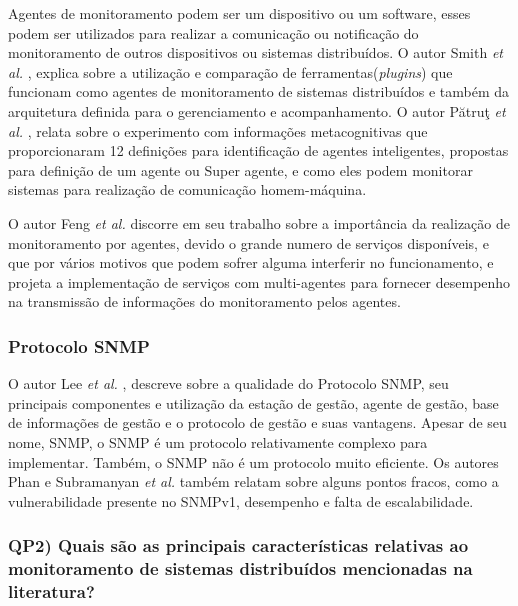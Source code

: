 Agentes de monitoramento podem ser um dispositivo ou um software, esses podem ser utilizados para realizar a comunicação ou notificação do monitoramento de outros dispositivos ou sistemas distribuídos. O autor Smith \textit{et al.} \cite{smith2008flexible}, explica sobre a utilização e comparação de ferramentas(\textit{plugins}) que funcionam como agentes de monitoramento de sistemas distribuídos e também da arquitetura definida para o gerenciamento e acompanhamento. O autor Pătruţ \textit{et al.} \cite{puatruct2010agent}, relata sobre o experimento com informações metacognitivas que proporcionaram 12 definições para identificação de agentes inteligentes, propostas para definição de um agente ou Super agente, e como eles podem monitorar sistemas para realização de comunicação homem-máquina.

O autor Feng \textit{et al.} \cite{feng2002distributed} discorre em seu trabalho sobre a importância da realização de monitoramento por agentes, devido o grande numero de serviços disponíveis, e que por vários motivos que podem sofrer alguma interferir no funcionamento, e projeta a implementação de serviços com multi-agentes para fornecer desempenho na transmissão de informações do monitoramento pelos agentes.

\subsubsection{Protocolo SNMP}
\label{snmpDescription}

O autor Lee \textit{et al.} \cite{lee2004design}, descreve sobre a qualidade do Protocolo \acrshort{SNMP}, seu principais componentes e utilização da estação de gestão, agente de gestão, base de informações de gestão e o protocolo de gestão e suas vantagens. Apesar  de  seu  nome,  \acrlong{SNMP},  o  \acrshort{SNMP}  é  um protocolo  relativamente  complexo  para  implementar.  Também,  o  \acrshort{SNMP}  não  é  um protocolo muito eficiente. Os autores Phan e Subramanyan \textit{et al.} \cite{phan2009cryptanalysis,subramanyan2000scalable} também relatam sobre alguns pontos fracos, como a vulnerabilidade presente no SNMPv1, desempenho e falta de escalabilidade.

\subsubsection{QP2) Quais são as principais características relativas ao monitoramento de sistemas distribuídos mencionadas na literatura?}

